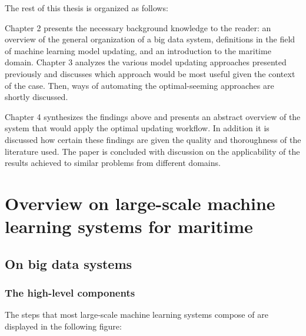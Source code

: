 
The rest of this thesis is organized as follows:

Chapter 2 presents the necessary background knowledge to the reader: an overview of the general organization of a big data system, definitions in the field of machine learning model updating, and an introduction to the maritime domain. Chapter 3 analyzes the various model updating approaches presented previously and discusses which approach would be most useful given the context of the case. Then, ways of automating the optimal-seeming approaches are shortly discussed. 

Chapter 4 synthesizes the findings above and presents an abstract overview of the system that would apply the optimal updating workflow. In addition it is discussed how certain these findings are given the quality and thoroughness of the literature used. The paper is concluded with discussion on the applicability of the results achieved to similar problems from different domains.

\chapter{Overview on large-scale machine learning systems for maritime}


\section{On big data systems}



\subsection{The high-level components}


The steps that most large-scale machine learning systems compose of are displayed in the following figure: 

